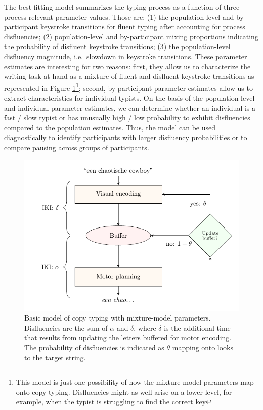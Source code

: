 \documentclass[
  english,
  man,mask,floatsintext]{apa7}
\begin{document}
The best fitting model summarizes the typing process as a function of three process-relevant parameter values. Those are: (1) the population-level and by-participant keystroke transitions for fluent typing after accounting for process disfluencies; (2) population-level and by-participant mixing proportions indicating the probability of disfluent keystroke transitions; (3) the population-level disfluency magnitude, i.e.~slowdown in keystroke transitions. These parameter estimates are interesting for two reasons: first, they allow us to characterize the writing task at hand as a mixture of fluent and disfluent keystroke transitions as represented in Figure \ref{fig:modelv2}\footnote{This model is just one possibility of how the mixture-model parameters map onto copy-typing. Disfluencies might as well arise on a lower level, for example, when the typist is struggling to find the correct key}; second, by-participant parameter estimates allow us to extract characteristics for individual typists. On the basis of the population-level and individual parameter estimates, we can determine whether an individual is a fast / slow typist or has unusually high / low probability to exhibit disfluencies compared to the population estimates. Thus, the model can be used diagnostically to identify participants with larger disfluency probabilities or to compare pausing across groups of participants.

\begin{figure}[bp!]

{\centering \includegraphics{spelling_decision_probs} 

}

\caption{Basic model of copy typing with mixture-model parameters. Disfluencies are the sum of $\alpha$ and $\delta$, where $\delta$ is the additional time that results from updating the letters buffered for motor encoding. The probability of disfluencies is indicated as $\theta$ mapping onto looks to the target string.}\label{fig:modelv2}
\end{figure}
\end{document}
